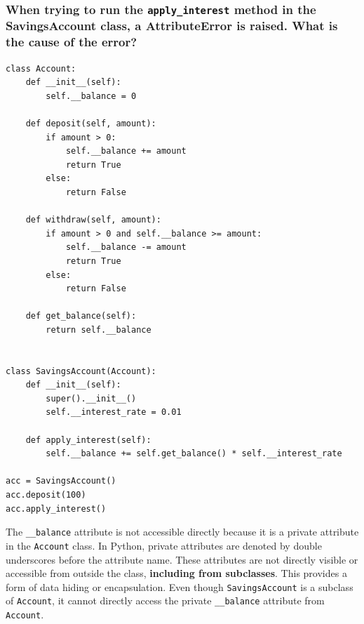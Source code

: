 \subsubsection{When trying to run the \texttt{apply\_interest} method in the SavingsAccount class, a AttributeError is raised. What is the cause of the error?}
\begin{codebox}
\begin{verbatim}
class Account:
    def __init__(self):
        self.__balance = 0
 
    def deposit(self, amount):
        if amount > 0:
            self.__balance += amount
            return True
        else:
            return False
 
    def withdraw(self, amount):
        if amount > 0 and self.__balance >= amount:
            self.__balance -= amount
            return True
        else:
            return False
 
    def get_balance(self):
        return self.__balance
 
 
class SavingsAccount(Account):
    def __init__(self):
        super().__init__()
        self.__interest_rate = 0.01
 
    def apply_interest(self):
        self.__balance += self.get_balance() * self.__interest_rate

acc = SavingsAccount()
acc.deposit(100)
acc.apply_interest()
\end{verbatim}
\end{codebox}

The \texttt{\_\_balance} attribute is not accessible directly because it is a private attribute in the \texttt{Account} class. In Python, private attributes are denoted by double underscores before the attribute name. These attributes are not directly visible or accessible from outside the class, \textbf{including from subclasses}. This provides a form of data hiding or encapsulation. Even though \texttt{SavingsAccount} is a subclass of \texttt{Account}, it cannot directly access the private \texttt{\_\_balance} attribute from \texttt{Account}.

\newpage
